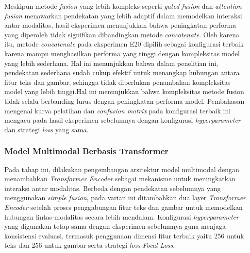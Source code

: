 Meskipun metode \textit{fusion} yang lebih kompleks seperti \textit{gated fusion} dan \textit{attention fusion} menawarkan pendekatan yang lebih adaptif dalam memodelkan interaksi antar modalitas, hasil eksperimen menunjukkan bahwa peningkatan performa yang diperoleh tidak signifikan dibandingkan metode \textit{concatenate}. Oleh karena itu, metode \textit{concatenate} pada eksperimen E20 dipilih sebagai konfigurasi terbaik karena mampu menghasilkan performa yang tinggi dengan kompleksitas model yang lebih sederhana. Hal ini menunjukkan bahwa dalam penelitian ini, pendekatan sederhana sudah cukup efektif untuk menangkap hubungan antara fitur teks dan gambar, sehingga tidak diperlukan penambahan kompleksitas model yang lebih tinggi.Hal ini menunjukkan bahwa kompleksitas metode fusion tidak selalu berbanding lurus dengan peningkatan performa model. Pembahasan mengenai kurva pelatihan dan \textit{confusion matrix} pada konfigurasi terbaik ini mengacu pada hasil eksperimen sebelumnya dengan konfigurasi \textit{hyperparameter} dan strategi \textit{loss} yang sama.

\subsubsection{Model Multimodal Berbasis Transformer} \label{IV.Multimodal Transformer}
Pada tahap ini, dilakukan pengembangan arsitektur model multimodal dengan menambahkan \textit{Transformer Encoder} sebagai mekanisme untuk meningkatkan interaksi antar modalitas. Berbeda dengan pendekatan sebelumnya yang menggunakan \textit{simple fusion}, pada varian ini ditambahkan dua layer \textit{Transformer Encoder} setelah proses penggabungan fitur teks dan gambar untuk memodelkan hubungan lintas-modalitas secara lebih mendalam. Konfigurasi \textit{hyperparameter} yang digunakan tetap sama dengan eksperimen sebelumnya guna menjaga konsistensi evaluasi, termasuk penggunaan dimensi fitur terbaik yaitu 256 untuk teks dan 256 untuk gambar serta strategi \textit{loss} \textit{Focal Loss}. 

\begin{table}[H]
    \centering
    \caption{Hasil Eksperimen Model \textit{Multimodal Positional Embedding}}
    \label{table:4.multimodal_positional}
    \small
    \setlength{\tabcolsep}{6pt} %
    \renewcommand{\arraystretch}{1.2}
    
\end{table}


